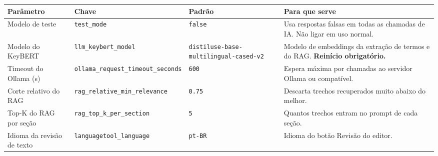 \documentclass[
  brazilian,
  a4paper,12pt,oneside]{report}
\newcounter{none} %
\begin{document}
{\def\LTcaptype{none} %
\begin{longtable}[]{@{}
  >{\raggedright\arraybackslash}p{}
  >{\raggedright\arraybackslash}p{}
  >{\raggedright\arraybackslash}p{}
  >{\raggedright\arraybackslash}p{}@{}}
\toprule\noalign{}
\begin{minipage}[b]{\linewidth}\raggedright
Parâmetro
\end{minipage} & \begin{minipage}[b]{\linewidth}\raggedright
Chave
\end{minipage} & \begin{minipage}[b]{\linewidth}\raggedright
Padrão
\end{minipage} & \begin{minipage}[b]{\linewidth}\raggedright
Para que serve
\end{minipage} \\
\midrule\noalign{}
\endhead
\bottomrule\noalign{}
\endlastfoot
Modelo de teste & \texttt{test\_}\allowbreak{}\texttt{mode} &
\texttt{false} & Usa respostas falsas em todas as chamadas de IA. Não
ligar em uso normal. \\
Modelo do KeyBERT &
\texttt{llm\_}\allowbreak{}\texttt{keybert\_}\allowbreak{}\texttt{model}
&
\texttt{distiluse-}\allowbreak{}\texttt{base-}\allowbreak{}\texttt{multilingual-}\allowbreak{}\texttt{cased-}\allowbreak{}\texttt{v2}
& Modelo de embeddings da extração de termos e do RAG. \textbf{Reinício
obrigatório.} \\
Timeout do Ollama (s) &
\texttt{ollama\_}\allowbreak{}\texttt{request\_}\allowbreak{}\texttt{timeout\_}\allowbreak{}\texttt{seconds}
& \texttt{600} & Espera máxima por chamadas ao servidor Ollama ou
compatível. \\
Corte relativo do RAG &
\texttt{rag\_}\allowbreak{}\texttt{relative\_}\allowbreak{}\texttt{min\_}\allowbreak{}\texttt{relevance}
& \texttt{0.}\allowbreak{}\texttt{75} & Descarta trechos recuperados
muito abaixo do melhor. \\
Top-K do RAG por seção &
\texttt{rag\_}\allowbreak{}\texttt{top\_}\allowbreak{}\texttt{k\_}\allowbreak{}\texttt{per\_}\allowbreak{}\texttt{section}
& \texttt{5} & Quantos trechos entram no prompt de cada seção. \\
Idioma da revisão de texto &
\texttt{languagetool\_}\allowbreak{}\texttt{language} &
\texttt{pt-}\allowbreak{}\texttt{BR} & Idioma do botão Revisão do
editor. \\
\end{longtable}
}
\end{document}
